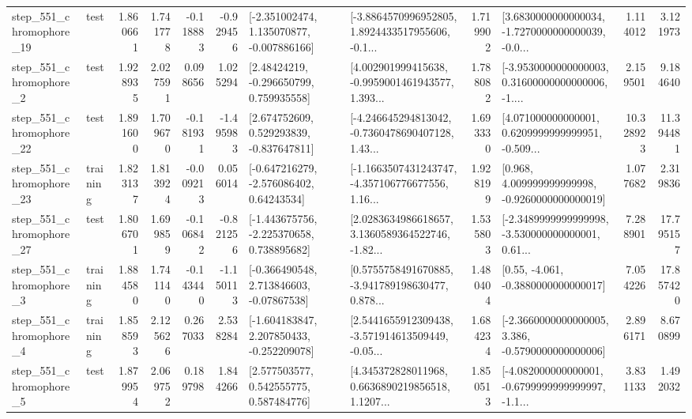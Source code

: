 \begin{tabular}{llrrrrllrlrr}
  step\_551\_chromophore\_19 &      test &      1.860661 &    1.741778 &     -0.118883 & -0.929456 &   [-2.351002474, 1.135070877, -0.007886166] &  [-3.8864570996952805, 1.8924433517955606, -0.1... &       1.719902 &  [3.6830000000000034, -1.7270000000000039, -0.0... &            1.114012 &          3.121973 \\
   step\_551\_chromophore\_2 &      test &      1.928935 &    2.027591 &      0.098656 &  1.025294 &     [2.48424219, -0.296650799, 0.759935558] &  [4.002901999415638, -0.9959001461943577, 1.393... &       1.788082 &  [-3.9530000000000003, 0.31600000000000006, -1.... &            2.159501 &          9.184640 \\
  step\_551\_chromophore\_22 &      test &      1.891600 &    1.709670 &     -0.181931 & -1.495983 &    [2.674752609, 0.529293839, -0.837647811] &  [-4.246645294813042, -0.7360478690407128, 1.43... &       1.693330 &  [4.071000000000001, 0.6209999999999951, -0.509... &           10.328923 &         11.394481 \\
  step\_551\_chromophore\_23 &  training &      1.823137 &    1.813924 &     -0.009213 &  0.056014 &    [-0.647216279, -2.576086402, 0.64243534] &  [-1.1663507431243747, -4.357106776677556, 1.16... &       1.928199 &    [0.968, 4.009999999999998, -0.9260000000000019] &            1.077682 &          2.319836 \\
  step\_551\_chromophore\_27 &      test &      1.806701 &    1.699859 &     -0.106842 & -0.821256 &   [-1.443675756, -2.225370658, 0.738895682] &  [2.0283634986618657, 3.1360589364522746, -1.82... &       1.535803 &  [-2.3489999999999998, -3.530000000000001, 0.61... &            7.288901 &         17.795157 \\
   step\_551\_chromophore\_3 &  training &      1.884580 &    1.741140 &     -0.143440 & -1.150113 &    [-0.366490548, 2.713846603, -0.07867538] &  [0.5755758491670885, -3.941789198630477, 0.878... &       1.480404 &                [0.55, -4.061, -0.3880000000000017] &            7.054226 &         17.857420 \\
   step\_551\_chromophore\_4 &  training &      1.858593 &    2.125626 &      0.267033 &  2.538284 &   [-1.604183847, 2.207850433, -0.252209078] &  [2.5441655912309438, -3.571914613509449, -0.05... &       1.684234 &  [-2.3660000000000005, 3.386, -0.5790000000000006] &            2.896171 &          8.670899 \\
   step\_551\_chromophore\_5 &      test &      1.879954 &    2.069752 &      0.189798 &  1.844266 &     [2.577503577, 0.542555775, 0.587484776] &  [4.345372828011968, 0.6636890219856518, 1.1207... &       1.850513 &  [-4.082000000000001, -0.6799999999999997, -1.1... &            3.831133 &          1.492032 \\

\end{tabular}

